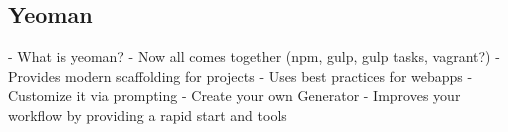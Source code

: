 
	\subsection{Yeoman} %
	\label{sub:yeoman}
		- What is yeoman?
		- Now all comes together (npm, gulp, gulp tasks, vagrant?)
		- Provides modern scaffolding for projects
		- Uses best practices for webapps
		- Customize it via prompting
		- Create your own Generator
		- Improves your workflow by providing a rapid start and tools

\pagebreak